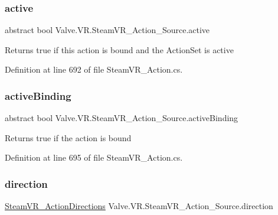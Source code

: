 \subsubsection{\texorpdfstring{active}{active}}
{\footnotesize\ttfamily abstract bool Valve.\+V\+R.\+Steam\+V\+R\+\_\+\+Action\+\_\+\+Source.\+active\hspace{0.3cm}{\ttfamily [get]}}



Returns true if this action is bound and the Action\+Set is active 



Definition at line 692 of file Steam\+V\+R\+\_\+\+Action.\+cs.

\mbox{\label{class_valve_1_1_v_r_1_1_steam_v_r___action___source_a170594d0fcc97fba3bf7545851d63c11}} 
\subsubsection{\texorpdfstring{activeBinding}{activeBinding}}
{\footnotesize\ttfamily abstract bool Valve.\+V\+R.\+Steam\+V\+R\+\_\+\+Action\+\_\+\+Source.\+active\+Binding\hspace{0.3cm}{\ttfamily [get]}}



Returns true if the action is bound 



Definition at line 695 of file Steam\+V\+R\+\_\+\+Action.\+cs.

\mbox{\label{class_valve_1_1_v_r_1_1_steam_v_r___action___source_a67903c42bb717287d4a1a4a0f972537a}} 
\subsubsection{\texorpdfstring{direction}{direction}}
{\footnotesize\ttfamily \mbox{\hyperlink{namespace_valve_1_1_v_r_a1e6192cb5ddaf204afab87ccb5728780}{Steam\+V\+R\+\_\+\+Action\+Directions}} Valve.\+V\+R.\+Steam\+V\+R\+\_\+\+Action\+\_\+\+Source.\+direction\hspace{0.3cm}{\ttfamily [get]}}



